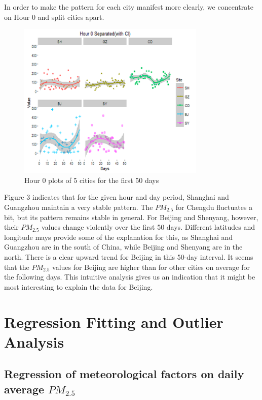 \documentclass[11pt]{article} %
\begin{document}
In order to make the pattern for each city manifest more clearly, we concentrate on Hour 0 and split cities apart. 

\begin{figure}[!ht]
  \centering
    \includegraphics[width=0.8\textwidth]{Figure1-3}
      \caption{Hour 0 plots of 5 cities for the first 50 days}
\end{figure}

Figure 3 indicates that for the given hour and day period, Shanghai and Guangzhou maintain a very stable pattern. The \(PM_{2.5}\) for Chengdu fluctuates a bit, but its pattern remains stable in general. For Beijing and Shenyang, however, their  \(PM_{2.5}\) values change violently over the first 50 days. Different latitudes and longitude mays provide some of the explanation for this, as Shanghai and Guangzhou are in the south of China, while Beijing and Shenyang are in the north. 
	There is a clear upward trend for Beijing in this 50-day interval. It seems that the \(PM_{2.5}\) values for Beijing are higher than for other cities on average for the following days. This intuitive analysis gives us an indication that it might be most interesting to explain the data for Beijing.

\newpage

\section{Regression Fitting and Outlier Analysis}
\subsection{Regression of meteorological factors on daily average \(PM_{2.5}\)}
\end{document}
